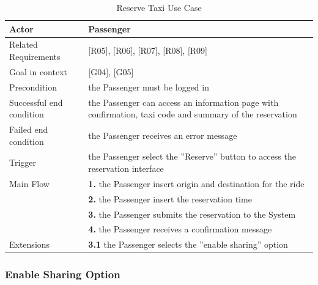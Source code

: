 \begin{table}[htbp]
\begin{center}
\begin{tabular}[t]{p{}p{}}

\hline
Actor & Passenger \\
\hline
Related Requirements & [R05], [R06], [R07], [R08], [R09] \\
\hline
Goal in context & [G04], [G05] \\
\hline
Precondition & the Passenger must be logged in \\
\hline
Successful end condition & 
the Passenger can access an information page with confirmation, taxi code and summary of the reservation
 \\
\hline
Failed end condition & the Passenger receives an error message  \\
\hline
Trigger & the Passenger select the ''Reserve'' button to access the reservation interface \\
\hline
Main Flow & \textbf{1.} the Passenger insert origin and destination for the ride \\
& \textbf{2.} the Passenger insert the reservation time \\
& \textbf{3.} the Passenger submits the reservation to the System \\
& \textbf{4.} the Passenger receives a confirmation message \\
\hline
Extensions & \textbf{3.1} the Passenger selects the ''enable sharing'' option \\
\hline

\end{tabular}
\end{center}
\caption{Reserve Taxi Use Case}
\end{table}
\clearpage

\subsubsection{Enable Sharing Option}

